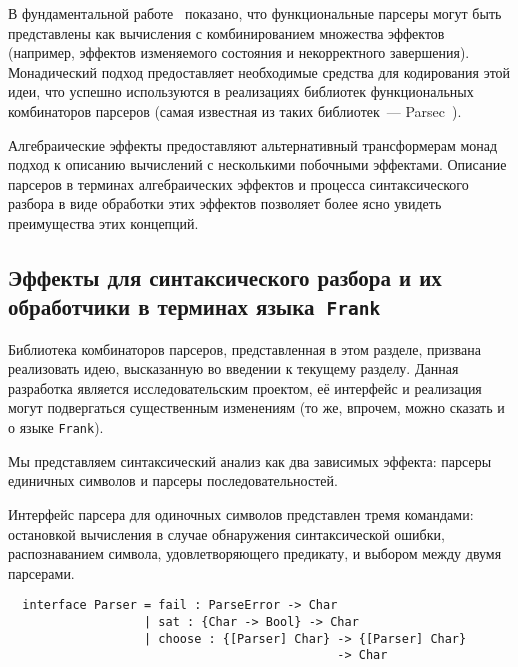 \documentclass [a4paper] {article}
\begin{document}
В фундаментальной работе~\cite{monParsing} показано, что функциональные парсеры могут быть представлены как вычисления с комбинированием множества эффектов (например, эффектов изменяемого состояния и некорректного завершения). Монадический подход предоставляет
необходимые средства для кодирования этой идеи, что успешно используются в реализациях библиотек
функциональных комбинаторов парсеров (самая известная из таких библиотек~--- Parsec~\cite{parsec}).

Алгебраические эффекты предоставляют альтернативный трансформерам монад подход к
описанию вычислений с несколькими побочными эффектами. Описание парсеров в
терминах алгебраических эффектов и процесса синтаксического разбора в виде
обработки этих эффектов позволяет более ясно увидеть преимущества этих концепций.

\subsection{Эффекты для синтаксического разбора и их обработчики
            в терминах языка~\texttt{Frank}}

Библиотека комбинаторов парсеров, представленная в этом разделе, призвана реализовать идею, высказанную во введении к текущему разделу. Данная разработка является
исследовательским проектом, её интерфейс и реализация могут подвергаться существенным изменениям (то же, впрочем, можно сказать и о языке \texttt{Frank}).

Мы представляем синтаксический анализ
как два зависимых эффекта: парсеры единичных символов и парсеры
последовательностей.

Интерфейс парсера для одиночных символов представлен тремя командами: остановкой
вычисления в случае обнаружения синтаксической ошибки, распознаванием символа,
удовлетворяющего предикату, и выбором между двумя парсерами.
\begin{verbatim}
  interface Parser = fail : ParseError -> Char
                   | sat : {Char -> Bool} -> Char
                   | choose : {[Parser] Char} -> {[Parser] Char}
                                              -> Char
\end{verbatim}
\end{document}

